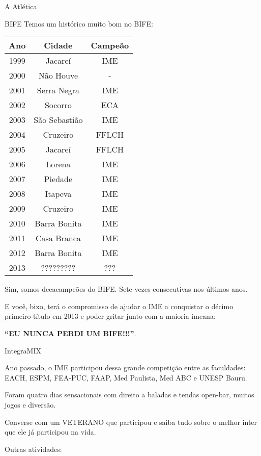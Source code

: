\begin{secao}{A Atlética}
\begin{subsecao}{BIFE}
Temos um histórico muito bom no BIFE:
\begin{center}
	\begin{tabular}{c|c|c}
	  Ano & Cidade & Campeão\\
	  \hline
	  1999 & Jacareí & IME\\
	  2000 & Não Houve & - \\
	  2001 & Serra Negra & IME\\
	  2002 & Socorro & ECA\\
	  2003 & São Sebastião & IME\\
	  2004 & Cruzeiro & FFLCH\\
	  2005 & Jacareí & FFLCH\\
	  2006 & Lorena & IME\\
	  2007 & Piedade & IME\\
	  2008 & Itapeva & IME\\
	  2009 & Cruzeiro & IME\\
	  2010 & Barra Bonita & IME\\
	  2011 & Casa Branca & IME\\
	  2012 & Barra Bonita & IME\\
	  2013 & ????????? & ???
	\end{tabular}
\end{center}

Sim, somos decacampeões do BIFE. Sete vezes consecutivas nos últimos anos.

E você, bixo, terá o compromisso de ajudar o IME a conquistar o décimo primeiro 
título em 2013 e poder gritar junto com a maioria imeana:

\textbf{``EU NUNCA PERDI UM BIFE!!!''}.

\end{subsecao}
\begin{subsecao}{IntegraMIX}

Ano passado, o IME participou dessa grande competição entre as faculdades: EACH,
 ESPM, FEA-PUC, FAAP, Med Paulista, Med ABC e UNESP Bauru.

Foram quatro dias sensacionais com direito a baladas e tendas open-bar, muitos 
jogos e diversão.

Converse com um VETERANO que participou e saiba tudo sobre o melhor inter que 
ele já participou na vida.

\end{subsecao}

Outras atividades:


\end{secao}
